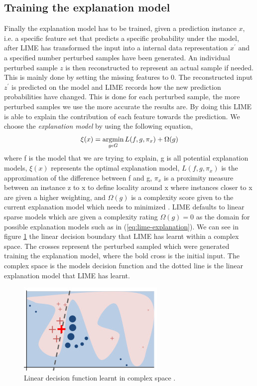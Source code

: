 \subsection{Training the explanation model} \label{sect:lime-expl-train} Finally the explanation model has to be trained, given a prediction instance $x$, i.e. a specific feature set that predicts a specific probability under the model, after LIME has transformed the input into a internal data representation $x^{'}$ and a specified number perturbed samples have been generated. An individual perturbed sample $z$ is then reconstructed to represent an actual sample if needed. This is mainly done by setting the missing features to 0. The reconstructed input $z^{'}$ is predicted on the model and LIME records how the new prediction probabilities have changed. This is done for each perturbed sample, the more perturbed samples we use the more accurate the results are. By doing this LIME is able to explain the contribution of each feature towards the prediction.
We choose the \emph{explanation model} by using the following equation,
\begin{equation}
\xi(x) = \operatorname*{argmin}_{g\epsilon G} L (f, g,\pi_{x} ) + \Omega(g)
\label{eq:explanation-loss}
\end{equation}
where f is the model that we are trying to explain, g is all potential explanation models, $\xi(x)$ represents the optimal explanation model, $L(f, g, \pi_{x})$ is the approximation of the difference between f and g, $\pi_{x}$ is a proximity measure between an instance z to x to define locality around x where instances closer to x are given a higher weighting, and $\Omega(g)$ is a complexity score given to the current explanation model which needs to minimized . LIME defaults to linear sparse models which are given a complexity rating $\Omega(g) = 0$  as the domain for possible explanation models such as in (\ref{eq:lime-explanation}).
We can see in figure \ref{fig:lime-boundary} the linear decision boundary that LIME has learnt within a complex space. The crosses represent the perturbed sampled which were generated training the explanation model, where the bold cross is the initial input. The complex space is the models decision function and the dotted line is the linear explanation model that LIME has learnt.

\begin  {figure}[!htpb]
\centering
  \includegraphics[width=0.7\linewidth]{Evaluation_Images/Lime_boundary.jpg}
  \caption{Linear decision function learnt in complex space \cite{lime}.}
  \label{fig:lime-boundary}
\end{figure}



